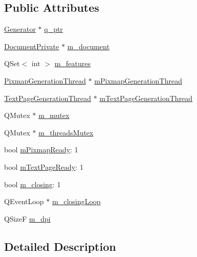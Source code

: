 \subsection*{Public Attributes}
\begin{DoxyCompactItemize}
\item 
\hyperlink{classOkular_1_1Generator}{Generator} $\ast$ \hyperlink{classOkular_1_1GeneratorPrivate_a7cfb588657967371d94b37d79c4be1d2}{q\+\_\+ptr}
\item 
\hyperlink{classOkular_1_1DocumentPrivate}{Document\+Private} $\ast$ \hyperlink{classOkular_1_1GeneratorPrivate_aaff9e2470745eed4bde94aa19be9b891}{m\+\_\+document}
\item 
Q\+Set$<$ int $>$ \hyperlink{classOkular_1_1GeneratorPrivate_a22cf6f9bf82b109180f9a2c848c9339f}{m\+\_\+features}
\item 
\hyperlink{classOkular_1_1PixmapGenerationThread}{Pixmap\+Generation\+Thread} $\ast$ \hyperlink{classOkular_1_1GeneratorPrivate_ad338541906a624475b2ae8dcdb691857}{m\+Pixmap\+Generation\+Thread}
\item 
\hyperlink{classOkular_1_1TextPageGenerationThread}{Text\+Page\+Generation\+Thread} $\ast$ \hyperlink{classOkular_1_1GeneratorPrivate_ac14572c55de4eb805ccc67655a26b9e4}{m\+Text\+Page\+Generation\+Thread}
\item 
Q\+Mutex $\ast$ \hyperlink{classOkular_1_1GeneratorPrivate_aea7467a2404ce0dc1a3b3ffd9303fa03}{m\+\_\+mutex}
\item 
Q\+Mutex $\ast$ \hyperlink{classOkular_1_1GeneratorPrivate_ae7b9db42a3b44647ae1e6e4d44a57d63}{m\+\_\+threads\+Mutex}
\item 
bool \hyperlink{classOkular_1_1GeneratorPrivate_a2a9228430f99bf1800a1060e132c94bb}{m\+Pixmap\+Ready}\+: 1
\item 
bool \hyperlink{classOkular_1_1GeneratorPrivate_a755c2ed0be6fae5b3c2f9500aa6f1143}{m\+Text\+Page\+Ready}\+: 1
\item 
bool \hyperlink{classOkular_1_1GeneratorPrivate_a7d341f5f522cadfa690f0ec17e4cfe12}{m\+\_\+closing}\+: 1
\item 
Q\+Event\+Loop $\ast$ \hyperlink{classOkular_1_1GeneratorPrivate_a149e0e50d6cd4f2301144db1b50b42be}{m\+\_\+closing\+Loop}
\item 
Q\+Size\+F \hyperlink{classOkular_1_1GeneratorPrivate_a732d60f4510326e5ec086eceef9ef828}{m\+\_\+dpi}
\end{DoxyCompactItemize}


\subsection{Detailed Description}


